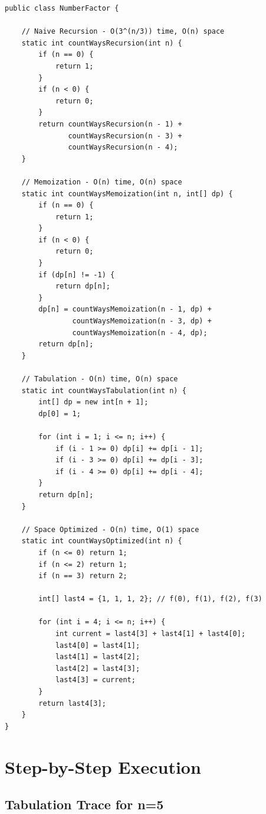 \documentclass[12pt,a4paper]{article}
\begin{document}
\begin{lstlisting}[caption=Complete Java Implementation]
public class NumberFactor {
    
    // Naive Recursion - O(3^(n/3)) time, O(n) space
    static int countWaysRecursion(int n) {
        if (n == 0) {
            return 1;
        }
        if (n < 0) {
            return 0;
        }
        return countWaysRecursion(n - 1) + 
               countWaysRecursion(n - 3) + 
               countWaysRecursion(n - 4);
    }
    
    // Memoization - O(n) time, O(n) space
    static int countWaysMemoization(int n, int[] dp) {
        if (n == 0) {
            return 1;
        }
        if (n < 0) {
            return 0;
        }
        if (dp[n] != -1) {
            return dp[n];
        }
        dp[n] = countWaysMemoization(n - 1, dp) + 
                countWaysMemoization(n - 3, dp) + 
                countWaysMemoization(n - 4, dp);
        return dp[n];
    }
    
    // Tabulation - O(n) time, O(n) space
    static int countWaysTabulation(int n) {
        int[] dp = new int[n + 1];
        dp[0] = 1;
        
        for (int i = 1; i <= n; i++) {
            if (i - 1 >= 0) dp[i] += dp[i - 1];
            if (i - 3 >= 0) dp[i] += dp[i - 3];
            if (i - 4 >= 0) dp[i] += dp[i - 4];
        }
        return dp[n];
    }
    
    // Space Optimized - O(n) time, O(1) space
    static int countWaysOptimized(int n) {
        if (n <= 0) return 1;
        if (n <= 2) return 1;
        if (n == 3) return 2;
        
        int[] last4 = {1, 1, 1, 2}; // f(0), f(1), f(2), f(3)
        
        for (int i = 4; i <= n; i++) {
            int current = last4[3] + last4[1] + last4[0];
            last4[0] = last4[1];
            last4[1] = last4[2];
            last4[2] = last4[3];
            last4[3] = current;
        }
        return last4[3];
    }
}
\end{lstlisting}

\section{Step-by-Step Execution}

\subsection{Tabulation Trace for n=5}
\end{document}
